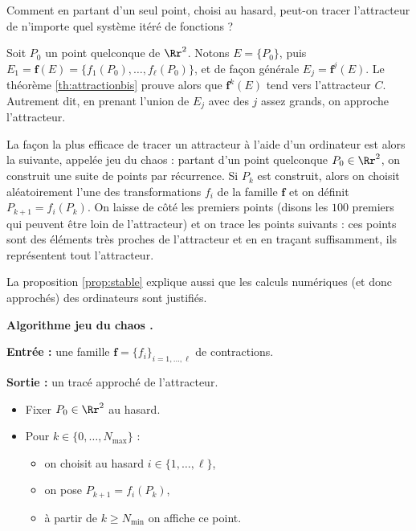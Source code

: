 \documentclass[11pt,class=report,crop=false]{standalone}
\begin{document}
Comment en partant d'un seul point, choisi au hasard, peut-on tracer l'attracteur de n'importe quel système itéré de fonctions ?

Soit $P_0$ un point quelconque de $\Rr^2$. Notons
$E = \{ P_0 \}$, puis $E_1 = \mathbf{f}(E) = \{f_1(P_0),\ldots,f_\ell(P_0)\}$,
et de façon générale $E_j = \mathbf{f}^j(E)$. 
Le théorème \ref{th:attractionbis} prouve alors que 
$\mathbf{f}^k(E)$ tend vers l'attracteur $C$. Autrement dit, en prenant l'union de $E_j$ avec 
des $j$ assez grands, on approche l'attracteur.

\bigskip

La façon la plus efficace de tracer un attracteur à l'aide d'un ordinateur est alors la suivante, 
appelée \og{} jeu du chaos \fg{} :
partant d'un point quelconque $P_0 \in \Rr^2$, on construit une suite de points par récurrence.
Si $P_k$ est construit, alors on choisit aléatoirement l'une des transformations
$f_i$ de la famille $\mathbf{f}$ et on définit $P_{k+1}=f_i(P_k)$. 
On laisse de côté les premiers points (disons les $100$ premiers qui peuvent être \og loin \fg{} de l'attracteur) et on trace les points suivants : ces points sont des éléments très proches de l'attracteur
et en en traçant suffisamment, ils représentent tout l'attracteur.

La proposition \ref{prop:stable} explique aussi que les calculs numériques (et donc approchés) 
des ordinateurs sont justifiés. 

\bigskip


\textbf{Algorithme \og jeu du chaos \fg{}.}

\textbf{Entrée :} une famille $\mathbf{f} = \{ f_i\}_{i=1,\ldots,\ell}$ de contractions.

\textbf{Sortie :} un tracé approché de l'attracteur.

\begin{itemize}
  \item Fixer $P_0 \in \Rr^2$ au hasard.
    
  \item Pour $k \in \{0,\ldots,N_{\max}\}$ :
  \begin{itemize}
      \item on choisit au hasard $i \in \{1,\ldots,\ell\}$,
      \item on pose $P_{k+1} = f_i(P_k)$,
      \item à partir de $k \ge N_{\min}$ on affiche ce point.
  \end{itemize}
\end{itemize}
\end{document}
